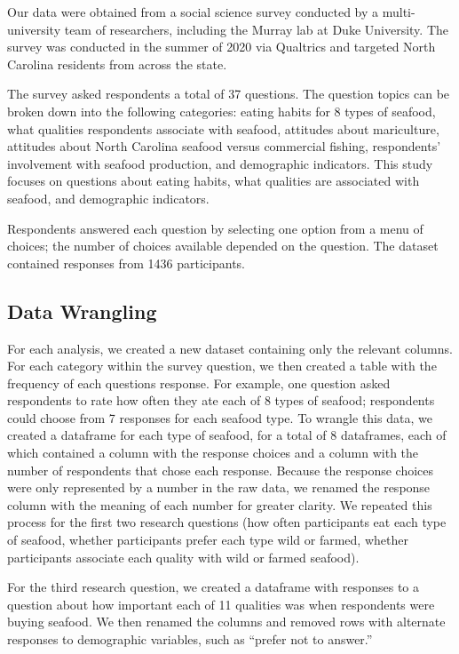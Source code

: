 \documentclass[
  12pt,
]{article}
\begin{document}
Our data were obtained from a social science survey conducted by a
multi-university team of researchers, including the Murray lab at Duke
University. The survey was conducted in the summer of 2020 via Qualtrics
and targeted North Carolina residents from across the state.

The survey asked respondents a total of 37 questions. The question
topics can be broken down into the following categories: eating habits
for 8 types of seafood, what qualities respondents associate with
seafood, attitudes about mariculture, attitudes about North Carolina
seafood versus commercial fishing, respondents' involvement with seafood
production, and demographic indicators. This study focuses on questions
about eating habits, what qualities are associated with seafood, and
demographic indicators.

Respondents answered each question by selecting one option from a menu
of choices; the number of choices available depended on the question.
The dataset contained responses from 1436 participants.

\hypertarget{data-wrangling}{%
\subsection{Data Wrangling}\label{data-wrangling}}

For each analysis, we created a new dataset containing only the relevant
columns. For each category within the survey question, we then created a
table with the frequency of each questions response. For example, one
question asked respondents to rate how often they ate each of 8 types of
seafood; respondents could choose from 7 responses for each seafood
type. To wrangle this data, we created a dataframe for each type of
seafood, for a total of 8 dataframes, each of which contained a column
with the response choices and a column with the number of respondents
that chose each response. Because the response choices were only
represented by a number in the raw data, we renamed the response column
with the meaning of each number for greater clarity. We repeated this
process for the first two research questions (how often participants eat
each type of seafood, whether participants prefer each type wild or
farmed, whether participants associate each quality with wild or farmed
seafood).

For the third research question, we created a dataframe with responses
to a question about how important each of 11 qualities was when
respondents were buying seafood. We then renamed the columns and removed
rows with alternate responses to demographic variables, such as ``prefer
not to answer.''
\end{document}
